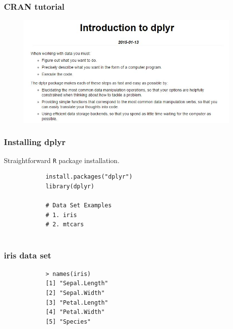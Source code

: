 \documentclass{beamer}
\begin{document}
	\begin{frame}
		\frametitle{CRAN tutorial}
\begin{figure}
\centering
\includegraphics[width=1.1\linewidth]{images/introdplyr}

\end{figure}

		
	\end{frame}
	\begin{frame}[fragile]
		\frametitle{Installing dplyr}
		Straightforward \texttt{R} package installation.
		\begin{framed}
			\begin{verbatim}
			install.packages("dplyr")
			library(dplyr)
			
			# Data Set Examples
			# 1. iris
			# 2. mtcars
			
			\end{verbatim}
		\end{framed}
	\end{frame}
	
	\begin{frame}[fragile]
		\frametitle{iris data set}
		\begin{framed}
			\begin{verbatim}
			> names(iris)
			[1] "Sepal.Length"
			[2] "Sepal.Width" 
			[3] "Petal.Length"
			[4] "Petal.Width" 
			[5] "Species"    
			\end{verbatim}
		\end{framed}
	\end{frame}
	
\end{document}
